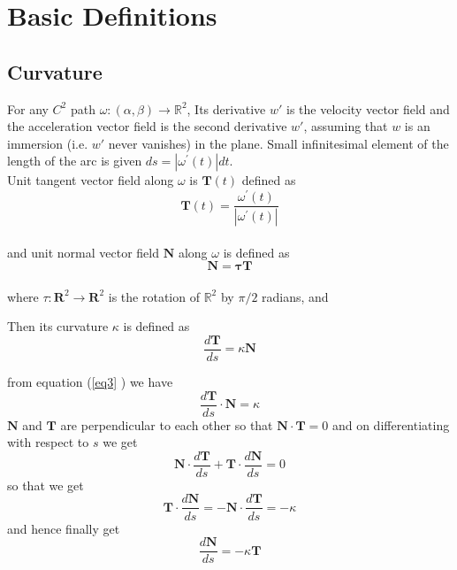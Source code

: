 \documentclass[oneside]{book}
\begin{document}
	\section{\textbf{Basic Definitions}}\label{s:1}
	\subsection{Curvature}
	\label{ss:1}
	
	For any $C^{2}$ path $\omega:(\alpha, \beta) \rightarrow \mathbb{R}^{2}$, Its derivative $w'$ is the velocity vector field  and the acceleration vector field is the second derivative  $w'$, assuming that $ w  $ is an immersion (i.e. $ w' $ never vanishes) in the plane. Small infinitesimal element of the length of the arc is given $d s=\left|\omega^{\prime}(t)\right| d t$.
	\\Unit tangent vector field along $\omega$ is $\mathbf{T}(t)$ defined as \\
	
	\begin{equation}
	\label{eq1}  
	\textbf{{T}}(t)=\frac{\omega^{\prime}(t)}{\left|\omega^{\prime}(t)\right|}
	\end{equation}  \\
	and unit normal vector field $\mathbf{N}$ along $\omega$ is defined as 
	\begin{equation}
	\label{eq2}  
	\mathbf{N}=\mathbf{\tau} \mathbf{T}
	\end{equation} \\
	where $ \tau: \mathbf{R}^{2} \rightarrow \mathbf{R}^{2}$ is the rotation of $\mathbb{R}^{2}$ by $\pi / 2$ radians, and
	
	Then its curvature $\kappa$ is defined as
	\begin{equation}
	\label{eq3}  
	\frac{d \mathbf{T}}{d s}=\kappa \mathbf{N}
	\end{equation}  
	
	from equation (\ref{eq3} ) we have
	$$ \frac{d \mathbf{T}}{d s} \cdot \mathbf{N} = \kappa $$
	$\mathbf{N}$ and $\mathbf{T}$ are perpendicular to each other so that $\mathbf{N} \cdot \mathbf{T} = 0 $
	and on differentiating with respect to $s$ we get 
	$$ \mathbf{N} \cdot \frac{d \mathbf{T}}{d s} + \mathbf{T} \cdot \frac{d \mathbf{N}}{d s} = 0 $$ 
	so that we get
	\hfill \break  
	$$ \mathbf{T} \cdot \frac{d \mathbf{N}}{d s} = -  \mathbf{N} \cdot \frac{d \mathbf{T}}{d s} = -\kappa  $$ 
	and hence finally get 
	\begin{equation}
	\label{eq4}  
	\frac{d \mathbf{N}}{d s}=-\kappa \mathbf{T}
	\end{equation}
	
\end{document}

